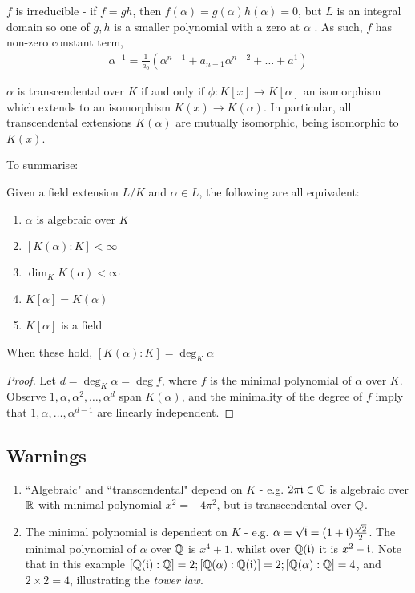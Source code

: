 \documentclass[10pt,a4paper]{article}
\begin{document}
$f$ is irreducible - if $f = gh$, then $f(\alpha) = g(\alpha)h(\alpha) = 0$, but $L$ is an integral domain so one of $g, h$ is a smaller polynomial with a zero at $\alpha$ \contr. As such, $f$ has non-zero constant term, 
\begin{align*}
\alpha^{-1} = \frac{1}{a_0}\left(\alpha^{n-1}+a_{n-1}\alpha^{n-2}+\ldots+a^1\right)
\end{align*}
\begin{proposition}
$\alpha$ is transcendental over $K$ if and only if $\phi:K[x] \rightarrow K[\alpha]$ an isomorphism which extends to an isomorphism $K(x)\rightarrow K(\alpha)$. In particular, all transcendental extensions $K(\alpha)$ are mutually isomorphic, being isomorphic to $K(x)$.
\end{proposition}
To summarise:
\begin{proposition}
Given a field extension $L/K$ and $\alpha \in L$, the following are all equivalent:
\begin{enumerate}
\item $\alpha$ is algebraic over $K$
\item $[K(\alpha) : K] < \infty$
\item $\dim_K K(\alpha) < \infty$
\item $K[\alpha] = K(\alpha)$
\item $K[\alpha]$ is a field
\end{enumerate}
When these hold, $[K(\alpha) : K] = \deg_K \alpha$
\end{proposition}
\begin{proof}
Let $d = \deg_K \alpha = \deg f$, where $f$ is the minimal polynomial of $\alpha$ over $K$. Observe $1, \alpha, \alpha^2, \ldots, \alpha^d$ span $K(\alpha)$, and the minimality of the degree of $f$ imply that $1, \alpha, \ldots, \alpha^{d-1}$ are linearly independent.
\end{proof}

\subsection*{Warnings}
\begin{enumerate}
\item``Algebraic" and ``transcendental" depend on $K$ - e.g. $2\pi\mathfrak{i} \in \mathbb{C}$ is algebraic over $\mathbb{R}$ with minimal polynomial $x^2 = -4\pi^2$, but is transcendental over $\mathbb{Q}$.
\item The minimal polynomial is dependent on $K$ - e.g. $\alpha = \sqrt{\mathfrak{i}} = (1+\mathfrak{i})\frac{\sqrt{2}}{2}$. The minimal polynomial of $\alpha$ over $\mathbb{Q}$ is $x^4+1$, whilst over $\mathbb{Q}(\mathfrak{i})$ it is $x^2 - \mathfrak{i}$. Note that in this example $[\mathbb{Q}(\mathfrak{i}):\mathbb{Q}] = 2; [\mathbb{Q}(\alpha):\mathbb{Q}(\mathfrak{i})] = 2; [\mathbb{Q}(\alpha):\mathbb{Q}] = 4$, and $2\times 2=4$, illustrating the \emph{tower law}.
\end{enumerate}
\end{document}

